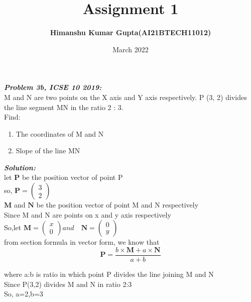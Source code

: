 \documentclass[journal,12pt,twocolumn]{IEEEtran}
\begin{document}
\newcommand{\myvec}[1]{\ensuremath{\begin{pmatrix}#1\end{pmatrix}}}

\let\vec\mathbf


\title{Assignment 1}
\author{\textbf{Himanshu Kumar Gupta(AI21BTECH11012)}}
\maketitle
\date {March 2022}


\textbf{\textit{Problem 3b, ICSE 10 2019:}}\\

 M and N are two points on the X axis and Y axis respectively. 
P (3, 2) divides the line segment MN in the ratio 2 : 3.\\
Find:
\begin{enumerate}
    \item The coordinates of M and N
    \item Slope of the line MN
\end{enumerate}

\textbf{\textit{Solution:}}\\

 let $\vec{P}$ be the position vector of point P\\
  so, $\vec{P}=\myvec{3 \\ 2}$\\
 $\vec{M}$ and $\vec{N}$ be the position vector of point M and N respectively\\
Since M and N are points on x and y axis respectively\\
  So,let $\vec{M}=\myvec{x\\0} and\quad \vec{N}=\myvec{0\\y}$\\
  
  from section formula in vector form, we know that\\
  \begin{equation}
  \label{eq:1}
\vec{P}=\frac{b\times \vec{M} +a\times \vec{N}}{a+b}     
  \end{equation}
 
  where a:b is ratio in which point P divides the line joining M and N\\
Since P(3,2) divides M and N in ratio 2:3\\
So, a=2,b=3\\
\end{document}
